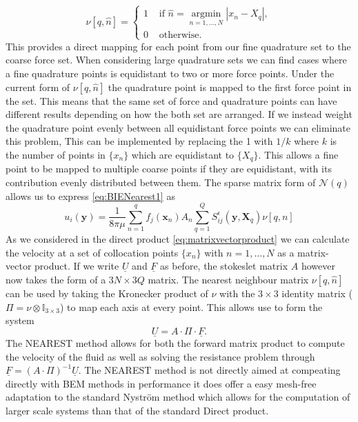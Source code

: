 \begin{equation}
\label{eq:NNMatrix}
    \nu [q, \hat{n}]= \begin{cases} 1 & \text { if } \hat{n}=\underset{n=1, \ldots, N}{\operatorname{argmin}}|x_n-X_q| , \\ 0 & \text { otherwise. }\end{cases}
\end{equation}
This provides a direct mapping for each point from our fine quadrature set to the coarse force set. When considering large quadrature sets we can find cases where a fine quadrature points is equidistant to two or more force points. Under the current form of $\nu [q, \hat{n}]$ the quadrature point is mapped to the first force point in the set. This means that the same set of force and quadrature points can have different results depending on how the both set are arranged. If we instead weight the quadrature point evenly between all equidistant force points we can eliminate this problem, This can be implemented by replacing the 1 with $1/k$ where $k$ is the number of points in $\{x_n\}$ which are equidistant to $\{X_q\}$. This allows a fine point to be mapped to multiple coarse points if they are equidistant, with its contribution evenly distributed between them. The sparse matrix form of $\mathcal{N}(q)$ allows us to express \cref{eq:BIENearest1} as 
\begin{equation}
    u_i(\bm{y}) = \frac{1}{8 \pi \mu} \sum_{n=1}^q  f_{j}(\bm{x}_n) A_n \sum_{q=1}^{Q}S_{i j}^{\epsilon}\left(\bm{y}, \bm{X}_q\right) \nu[q,n] 
\end{equation}
As we considered in the direct product \cref{eq:matrixvectorproduct} we can calculate the velocity at a set of collocation points $\{x_n\}$ with $n=1,\dots,N$ as a matrix-vector product. If we write $\underline{U}$ and $\underline{F}$ as before, the stokeslet matrix $A$ however now takes the form of a $3N \times 3Q$ matrix. The nearest neighbour matrix $\nu [q, \hat{n}]$ can be used by taking the Kronecker product of $\nu$ with the $3 \times 3$ identity matrix ($\Pi = \nu \otimes \mathbb{I}_{3\times3}$) to map each axis at every point. This allows use to form the system
\begin{equation}
    \underline{U} = A \cdot \Pi \cdot \underline{F}.
\end{equation}
The NEAREST method allows for both the forward matrix product to compute the velocity of the fluid as well as solving the resistance problem through $\underline{F} = (A \cdot \Pi)^{-1} \underline{U}$. The NEAREST method is not directly aimed at compeating directly with BEM methods in performance it does offer a easy mesh-free adaptation to the standard Nyström method which allows for the computation of larger scale systems than that of the standard Direct product.

